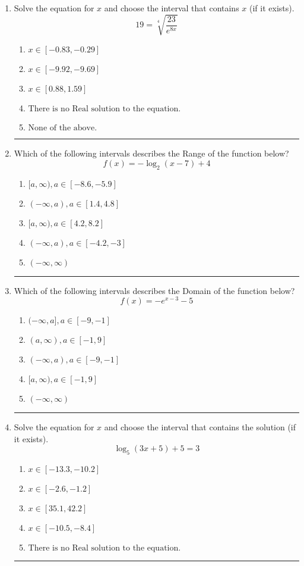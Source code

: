 \documentclass[14pt]{extbook}
\newcommand{\litem}[1]{\item#1\hspace*{-1cm}\rule{\textwidth}{0.4pt}}
\begin{document}
\begin{enumerate}
{\begin{enumerate}[label=\Alph*.]
\end{enumerate} }
\litem{
 Solve the equation for $x$ and choose the interval that contains $x$ (if it exists).\[  19 = \sqrt[4]{\frac{23}{e^{8x}}} \]\begin{enumerate}[label=\Alph*.]
\item \( x \in [-0.83, -0.29] \)
\item \( x \in [-9.92, -9.69] \)
\item \( x \in [0.88, 1.59] \)
\item \( \text{There is no Real solution to the equation.} \)
\item \( \text{None of the above.} \)

\end{enumerate} }
\litem{
Which of the following intervals describes the Range of the function below?\[ f(x) = -\log_2{(x-7)}+4 \]\begin{enumerate}[label=\Alph*.]
\item \( [a, \infty), a \in [-8.6, -5.9] \)
\item \( (-\infty, a), a \in [1.4, 4.8] \)
\item \( [a, \infty), a \in [4.2, 8.2] \)
\item \( (-\infty, a), a \in [-4.2, -3] \)
\item \( (-\infty, \infty) \)

\end{enumerate} }
\litem{
Which of the following intervals describes the Domain of the function below?\[ f(x) = -e^{x-3}-5 \]\begin{enumerate}[label=\Alph*.]
\item \( (-\infty, a], a \in [-9, -1] \)
\item \( (a, \infty), a \in [-1, 9] \)
\item \( (-\infty, a), a \in [-9, -1] \)
\item \( [a, \infty), a \in [-1, 9] \)
\item \( (-\infty, \infty) \)

\end{enumerate} }
\litem{
Solve the equation for $x$ and choose the interval that contains the solution (if it exists).\[ \log_{5}{(3x+5)}+5 = 3 \]\begin{enumerate}[label=\Alph*.]
\item \( x \in [-13.3, -10.2] \)
\item \( x \in [-2.6, -1.2] \)
\item \( x \in [35.1, 42.2] \)
\item \( x \in [-10.5, -8.4] \)
\item \( \text{There is no Real solution to the equation.} \)


\end{enumerate}}
\end{enumerate}
\end{document}
